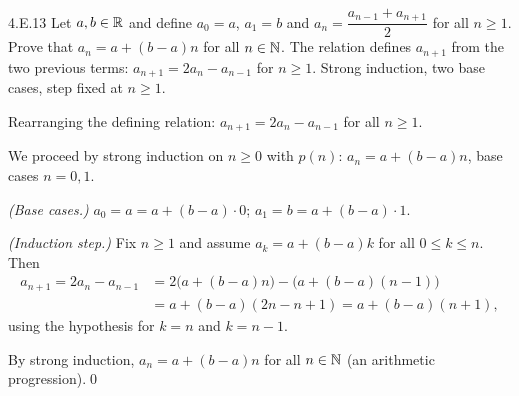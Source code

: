 \begin{bookex}[essential]{4.E.13}
Let $a,b\in\mathbb{R}$ and define $a_0=a$, $a_1=b$ and $a_n=\dfrac{a_{n-1}+a_{n+1}}2$ for all $n\ge1$. Prove that $a_n=a+(b-a)n$ for all $n\in\mathbb{N}$.
\solution
\plan The relation defines $a_{n+1}$ from the two previous terms: $a_{n+1}=2a_n-a_{n-1}$ for $n\ge1$. Strong induction, two base cases, step fixed at $n\ge1$.
\begin{steps}
\item Rearranging the defining relation: $a_{n+1}=2a_n-a_{n-1}$ for all $n\ge1$.
\item We proceed by strong induction on $n\ge0$ with $p(n)$: $a_n=a+(b-a)n$, base cases $n=0,1$.
\item \emph{(Base cases.)} $a_0=a=a+(b-a)\cdot0$; $a_1=b=a+(b-a)\cdot1$.
\item \emph{(Induction step.)} Fix $n\ge1$ and assume $a_k=a+(b-a)k$ for all $0\le k\le n$. Then
\begin{align*}
a_{n+1}=2a_n-a_{n-1}&=2\big(a+(b-a)n\big)-\big(a+(b-a)(n-1)\big)\\
&=a+(b-a)(2n-n+1)=a+(b-a)(n+1),
\end{align*}
using the hypothesis for $k=n$ and $k=n-1$.
\end{steps}
\conclusion By strong induction, $a_n=a+(b-a)n$ for all $n\in\mathbb{N}$ (an arithmetic progression).\qed
\end{bookex}

